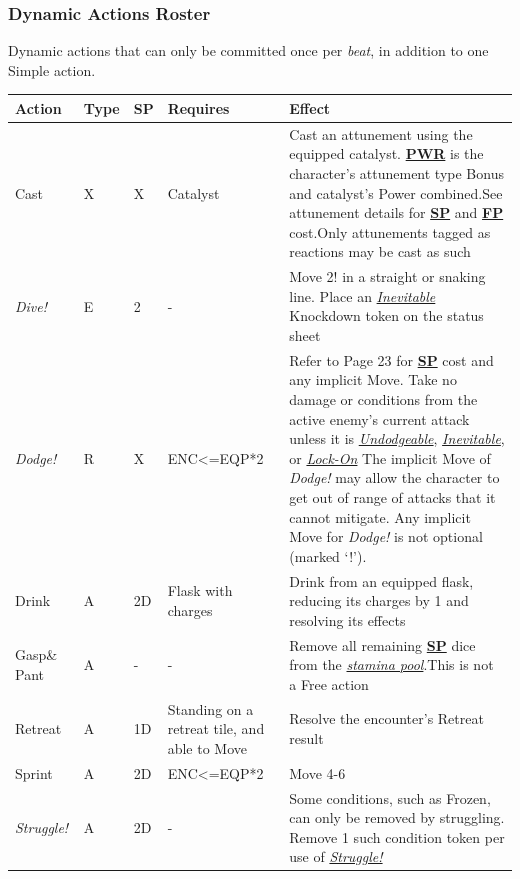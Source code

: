 \documentclass[12pt]{article}
\newcommand{\refto}[1]{\hyperlink{#1}{\textbf{#1}}}
\newcommand{\reftoit}[1]{\hyperlink{#1}{\emph{#1}}}
\begin{document}
\subsubsection{Dynamic Actions Roster}
Dynamic actions that can only be committed once per \emph{beat}, in addition to one Simple action.\\
\begin{center}
\begin{tabularx}{\textwidth}{p{}p{}p{}p{}p{}}
\hline
\textbf{Action} & \textbf{Type} & \textbf{SP} & \textbf{Requires} & \textbf{Effect}\setcounter{rownum}{0}\\
\hline
Cast & X & X & Catalyst & Cast an attunement using the equipped catalyst. \refto{PWR} is the character’s attunement type Bonus and catalyst’s Power combined.\newline See attunement details for \refto{SP} and \refto{FP} cost.\newline Only attunements tagged as reactions may be cast as such\\
\emph{Dive!} & E & 2 & - & Move 2! in a straight or snaking line.\newline
Place an \reftoit{Inevitable} Knockdown token on the status sheet\\
\emph{Dodge!} & R & X & ENC<=EQP*2 & Refer to Page 23 for \refto{SP} cost and any implicit Move.\newline
Take no damage or conditions from the active enemy’s current attack unless it is \reftoit{Undodgeable}, \reftoit{Inevitable}, or \reftoit{Lock-On}\newline
The implicit Move of \emph{Dodge!} may allow the character to get out of range of attacks that it cannot mitigate. Any implicit Move for \emph{Dodge!} is not optional (marked ‘!’).\\
Drink & A & 2D & Flask with charges & Drink from an equipped flask, reducing its charges by 1 and resolving its effects\\
Gasp\newline \& Pant & A & - & - & Remove all remaining \refto{SP} dice from the \reftoit{stamina pool}.\newline This is not a Free action\\
Retreat & A & 1D & Standing on a retreat tile, and able to Move & Resolve the encounter’s Retreat result\\
Sprint & A & 2D & ENC<=EQP*2 & Move 4-6\\
\emph{Struggle!}\hypertarget{Struggle!}{} & A & 2D & - & Some conditions, such as Frozen, can only be removed by struggling. Remove 1 such condition token per use of \reftoit{Struggle!}\\

\end{tabularx}
\end{center}
\end{document}
